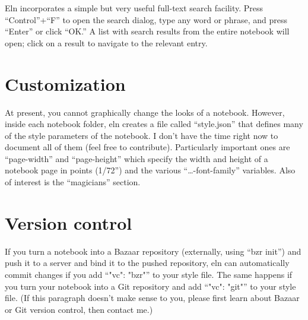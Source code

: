 \documentclass[11pt]{report}
\begin{document}
Eln incorporates a simple but very useful full-text search
facility. Press ``Control''+``F'' to open the search dialog, type any
word or phrase, and press ``Enter'' or click ``OK.'' A list with
search results from the entire notebook will open; click on a result
to navigate to the relevant entry.

\section{Customization}

At present, you cannot graphically change the looks of a
notebook. However, inside each notebook folder, eln creates a file
called ``style.json'' that defines many of the style parameters of the
notebook. I don't have the time right now to document all of them
(feel free to contribute). Particularly important ones are
``page-width'' and ``page-height'' which specify the width and height
of a notebook page in points (1/72'') and the various
``\ldots-font-family'' variables. Also of interest is the
``magicians'' section.

\section{Version control}

If you turn a notebook into a Bazaar repository (externally, using
``bzr init'') and push it to a server and bind it to the pushed
repository, eln can automatically commit changes if you add ``"vc":
"bzr"'' to your style file. The same happens if you turn your notebook
into a Git repository and add ``"vc": "git"'' to your style file. (If
this paragraph doesn't make sense to you, please first learn about
Bazaar or Git version control, then contact me.)
\end{document}
